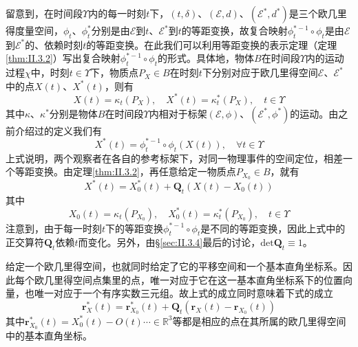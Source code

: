 \documentclass[main.tex]{subfiles}
\begin{document}
留意到，在时间段$\Upsilon$内的每一时刻$t$下，$\left(t,\delta\right)$、$\left(\mathcal{E},d\right)$、$\left(\mathcal{E}^*,d^*\right)$是三个欧几里得度量空间，$\phi_t$、$\phi_t^*$分别是由$\mathcal{E}$到$t$、$\mathcal{E}^*$到$t$的等距变换，故复合映射$\phi_t^{*-1}\circ\phi_t$是由$\mathcal{E}$到$\mathcal{E}^*$的、依赖时刻$t$的等距变换。在此我们可以利用等距变换的表示定理（定理\ref{thm:II.3.2}）写出复合映射$\phi_t^{*-1}\circ\phi_t$的形式。具体地，物体$B$在时间段$\Upsilon$内的运动过程$\chi$中，时刻$t\in\Upsilon$下，物质点$P_X\in B$在时刻$t$下分别对应于欧几里得空间$\mathcal{E}$、$\mathcal{E}^*$中的点$X\left(t\right)$、$X^*\left(t\right)$，则有
\[X\left(t\right)=\kappa_t\left(P_X\right),\quad X^*\left(t\right)=\kappa_t^*\left(P_X\right),\quad t\in\Upsilon\]
其中$\kappa$、$\kappa^*$分别是物体$B$在时间段$\Upsilon$内相对于标架$\left(\mathcal{E},\phi\right)$、$\left(\mathcal{E}^*,\phi^*\right)$的运动。由之前介绍过的定义我们有
\[X^*\left(t\right)=\phi_t^{*-1}\circ\phi_t\left(X\left(t\right)\right),\quad\forall t\in\Upsilon\]
上式说明，两个观察者在各自的参考标架下，对同一物理事件的空间定位，相差一个等距变换。由定理\ref{thm:II.3.2}，再任意给定一物质点$P_{X_0}\in B$，就有
\[X^*\left(t\right)=X_0^*\left(t\right)+\mathbf{Q}_t\left(X\left(t\right)-X_0\left(t\right)\right)\]
其中
\[X_0\left(t\right)=\kappa_t\left(P_{X_0}\right),\quad X_0^*\left(t\right)=\kappa_t^*\left(P_{X_0}\right),\quad t\in\Upsilon\]
注意到，由于每一时刻$t$下的等距变换$\phi_t^{*-1}\circ\phi_t$是不同的等距变换，因此上式中的正交算符$\mathbf{Q}_t$依赖$t$而变化。另外，由\S\ref{sec:II.3.4}最后的讨论，$\mathrm{det}\mathbf{Q}_t\equiv 1$。

给定一个欧几里得空间，也就同时给定了它的平移空间和一个基本直角坐标系。因此每个欧几里得空间点集里的点，唯一对应于它在这一基本直角坐标系下的位置向量，也唯一对应于一个有序实数三元组。故上式的成立同时意味着下式的成立
\[\mathbf{r}_X^*\left(t\right)=\mathbf{r}_{X_0}^*\left(t\right)+\mathbf{Q}_t\left(\mathbf{r}_X\left(t\right)-\mathbf{r}_{X_0}\left(t\right)\right)\]
其中$\mathbf{r}^*_{X_0}\left(t\right)=X_0^*\left(t\right)-O\left(t\right)\cdots\in\mathbb{R}^3$等都是相应的点在其所属的欧几里得空间中的基本直角坐标。
\end{document}
